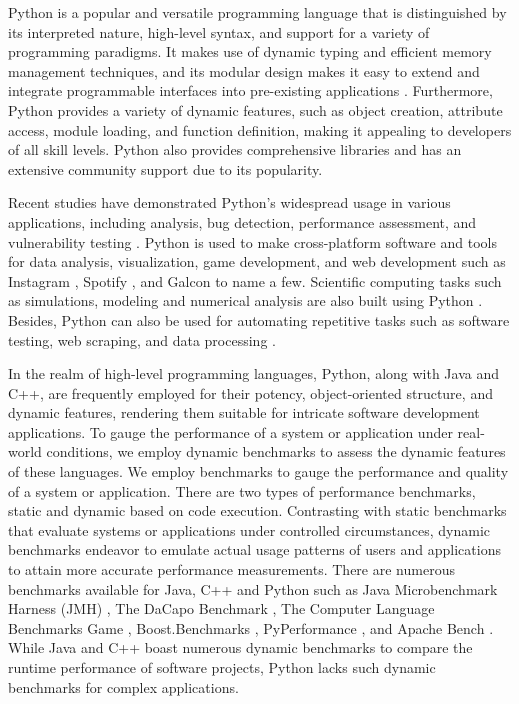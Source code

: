 Python is a popular and versatile programming language that is distinguished by its interpreted nature, high-level syntax, and support for a variety of programming paradigms.
It makes use of dynamic typing and efficient memory management techniques, and its modular design makes it easy to extend and integrate programmable interfaces into pre-existing applications \cite{Python_language_wiki}.
Furthermore, Python provides a variety of dynamic features, such as object creation, attribute access, module loading, and function definition, making it appealing to developers of all skill levels.
Python also provides comprehensive libraries and has an extensive community support due to its popularity.

Recent studies have demonstrated Python's widespread usage in various applications, including analysis, bug detection, performance assessment, and vulnerability testing \cite{Python_usage_study1, Python_usage_study2, Python_usage3}.
Python is used to make cross-platform software and tools for data analysis, visualization, game development, and web development such as Instagram \cite{Insta_architecture}, Spotify \cite{Spotify_python}, and Galcon \cite{game_python} to name a few.
Scientific computing tasks such as simulations, modeling and numerical analysis are also built using Python \cite{python_scientific}.
Besides, Python can also be used for automating repetitive tasks such as software testing, web scraping, and data processing \cite{python_automate}.

In the realm of high-level programming languages, Python, along with Java and C++, are frequently employed for their potency, object-oriented structure, and dynamic features, rendering them suitable for intricate software development applications. 
To gauge the performance of a system or application under real-world conditions, we employ dynamic benchmarks to assess the dynamic features of these languages.
We employ benchmarks to gauge the performance and quality of a system or application.
There are two types of performance benchmarks, static and dynamic based on code execution.
Contrasting with static benchmarks that evaluate systems or applications under controlled circumstances, dynamic benchmarks endeavor to emulate actual usage patterns of users and applications to attain more accurate performance measurements.
There are numerous benchmarks available for Java, C++ and Python such as Java Microbenchmark Harness (JMH) \cite{JMH}, The DaCapo Benchmark \cite{DaCapo_2006}, The Computer Language Benchmarks Game \cite{C++_Benchmark1}, Boost.Benchmarks \cite{Boost_Benchmarks}, PyPerformance \cite{PyPerformance}, and Apache Bench \cite{Apache_Benchmark}. 
While Java and C++ boast numerous dynamic benchmarks to compare the runtime performance of software projects, Python lacks such dynamic benchmarks for complex applications.


